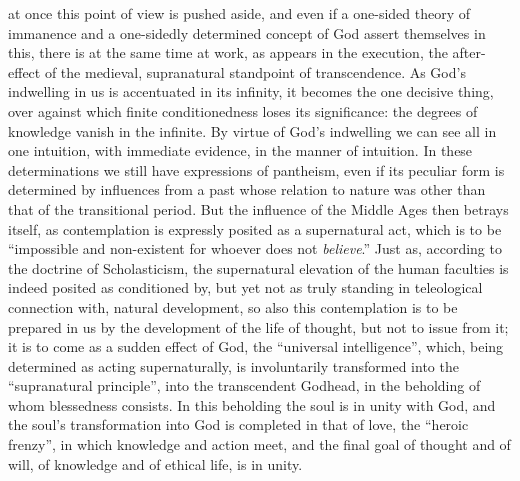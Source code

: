 at once this point of view is pushed aside, and even if a one-sided
theory of immanence and a one-sidedly determined concept of God assert
themselves in this, there is at the same time at work, as appears in
the execution, the after-effect of the medieval, supranatural
standpoint of transcendence. As God's indwelling in us is
accentuated in its infinity, it becomes the one decisive thing, over
against which finite conditionedness loses its significance: the degrees
of knowledge vanish in the infinite. By virtue of God's indwelling we can
see all in one intuition, with immediate evidence, in the manner of
intuition. In these determinations we still have expressions of
pantheism, even if its peculiar form is determined by influences from a
past whose relation to nature was other than that of the transitional
period. But the influence of the Middle Ages then betrays itself, as
contemplation is expressly posited as a supernatural act, which is to be
``impossible and non-existent for whoever does not \emph{believe}.'' Just
as, according to the doctrine of Scholasticism, the supernatural
elevation of the human faculties is indeed posited as conditioned by,
but yet not as truly standing in teleological connection with, natural
development, so also this contemplation is to be prepared in us by the
development of the life of thought, but not to issue from it; it is to
come as a sudden effect of God, the ``universal intelligence'', which,
being determined as acting supernaturally, is involuntarily transformed
into the ``supranatural principle'', into the transcendent Godhead, in
the beholding of whom blessedness consists. In this beholding the soul
is in unity with God, and the soul's transformation into God is
completed in that  of love, the ``heroic frenzy'', in which
knowledge and action meet, and the final goal of thought and of will, of
knowledge and of ethical life, is in unity.

\divrule

